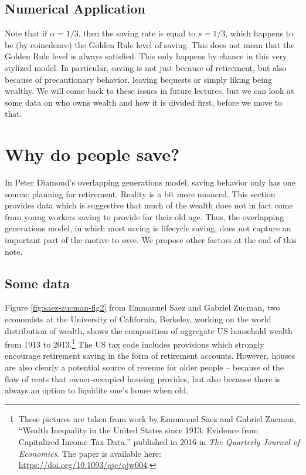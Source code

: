 \documentclass[]{book}
\let\rmarkdownfootnote\footnote%
\def\footnote{\protect\rmarkdownfootnote}
\begin{document}
\subsection{Numerical Application}\label{numerical-application}

Note that if \(\alpha=1/3\), then the saving rate is equal to
\(s = 1/3\), which happens to be (by coincdence) the Golden Rule level
of saving. This does not mean that the Golden Rule level is always
satisfied. This only happens by chance in this very stylized model. In
particular, saving is not just because of retirement, but also because
of precautionary behavior, leaving bequests or simply liking being
wealthy. We will come back to these issues in future lectures, but we
can look at some data on who owns wealth and how it is divided first,
before we move to that.

\section{Why do people save?}\label{why-do-people-save-olg}

In Peter Diamond's overlapping generations model, saving behavior only
has one source: planning for retirement. Reality is a bit more nuanced.
This section provides data which is suggestive that much of the wealth
does not in fact come from young workers saving to provide for their old
age. Thus, the overlapping generations model, in which most saving is
lifecycle saving, does not capture an important part of the motive to
save. We propose other factors at the end of this note.

\subsection{Some data}\label{some-data-1}

Figure \ref{fig:saez-zucman-fig2} from Emmanuel Saez and Gabriel Zucman,
two economists at the University of California, Berkeley, working on the
world distribution of wealth, shows the composition of aggregate US
household wealth from 1913 to 2013.\footnote{These pictures are taken
  from work by Emmanuel Saez and Gabriel Zucman, ``Wealth Inequality in
  the United States since 1913: Evidence from Capitalized Income Tax
  Data,'' published in 2016 in \emph{The Quarterly Journal of
  Economics}. The paper is available here:
  \url{https://doi.org/10.1093/qje/qjw004}.} The US tax code includes
provisions which strongly encourage retirement saving in the form of
retirement accounts. However, houses are also clearly a potential source
of revenue for older people -- because of the flow of rents that
owner-occupied housing provides, but also because there is always an
option to liquidite one's house when old.
\end{document}
